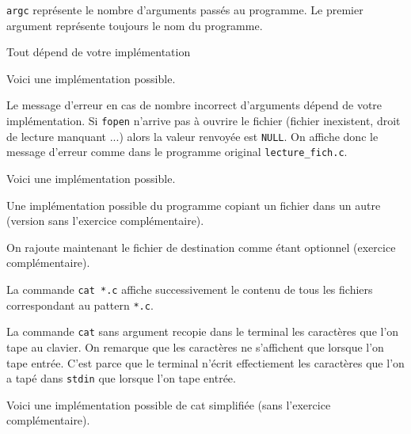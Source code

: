 \documentclass[10pt]{article}
\begin{document}
\begin{enumerate}[label=\textbf{[\alph*]}]
  \setlength\itemsep{1em}

\item \texttt{argc} représente le nombre d'arguments passés au
  programme. Le premier argument représente toujours le nom du
  programme.

\item Tout dépend de votre implémentation

\item Voici une implémentation possible.

  

\item Le message d'erreur en cas de nombre incorrect d'arguments
  dépend de votre implémentation. Si \texttt{fopen} n'arrive pas à ouvrire le
  fichier (fichier inexistent, droit de lecture manquant ...) alors la
  valeur renvoyée est \texttt{NULL}. On affiche donc le message d'erreur comme
  dans le programme original \texttt{lecture\_fich.c}.

  Voici une implémentation possible.

  

\item Une implémentation possible du programme copiant un fichier dans
  un autre (version sans l'exercice complémentaire).

  

  \newpage

  On rajoute maintenant le fichier de destination comme étant
  optionnel (exercice complémentaire).

  

\item La commande \texttt{cat *.c} affiche successivement le contenu
  de tous les fichiers correspondant au pattern \texttt{*.c}.

\item La commande \texttt{cat} sans argument recopie dans le terminal
  les caractères que l'on tape au clavier. On remarque que les
  caractères ne s'affichent que lorsque l'on tape entrée. C'est parce
  que le terminal n'écrit effectiement les caractères que l'on a tapé
  dans \texttt{stdin} que lorsque l'on tape entrée.

\item Voici une implémentation possible de cat simplifiée (sans
  l'exercice complémentaire).


\end{enumerate}
\end{document}
